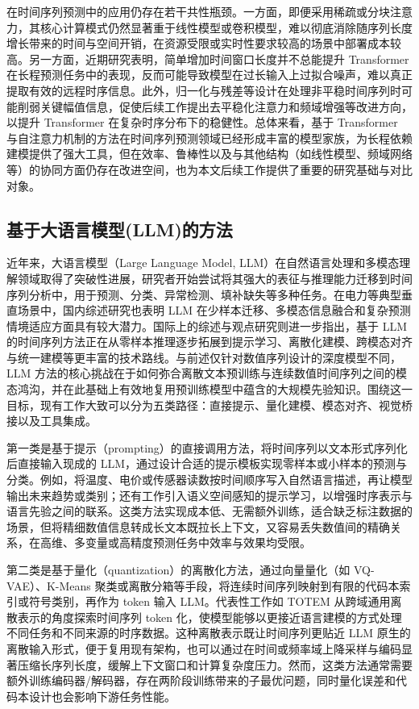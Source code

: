 在时间序列预测中的应用仍存在若干共性瓶颈。一方面，即便采用稀疏或分块注意力，其核心计算模式仍然显著重于线性模型或卷积模型，难以彻底消除随序列长度增长带来的时间与空间开销，在资源受限或实时性要求较高的场景中部署成本较高。另一方面，近期研究表明，简单增加时间窗口长度并不总能提升 Transformer 在长程预测任务中的表现，反而可能导致模型在过长输入上过拟合噪声，难以真正提取有效的远程时序信息。此外，归一化与残差等设计在处理非平稳时间序列时可能削弱关键幅值信息，促使后续工作提出去平稳化注意力\cite{liu2022nonstationary}和频域增强等改进方向，以提升 Transformer 在复杂时序分布下的稳健性。总体来看，基于 Transformer 与自注意力机制的方法在时间序列预测领域已经形成丰富的模型家族，为长程依赖建模提供了强大工具，但在效率、鲁棒性以及与其他结构（如线性模型、频域网络等）的协同方面仍存在改进空间，也为本文后续工作提供了重要的研究基础与对比对象。

\subsection{基于大语言模型(LLM)的方法} 近年来，大语言模型（Large Language Model, LLM）在自然语言处理和多模态理解领域取得了突破性进展，研究者开始尝试将其强大的表征与推理能力迁移到时间序列分析中，用于预测、分类、异常检测、填补缺失等多种任务。在电力等典型垂直场景中，国内综述研究也表明 LLM 在少样本迁移、多模态信息融合和复杂预测情境适应方面具有较大潜力\cite{zhang2025llmpowercn}。国际上的综述与观点研究则进一步指出，基于 LLM 的时间序列方法正在从零样本推理逐步拓展到提示学习、离散化建模、跨模态对齐与统一建模等更丰富的技术路线\cite{zhang2024llmtsurvey,jin2024position}。与前述仅针对数值序列设计的深度模型不同，LLM 方法的核心挑战在于如何弥合离散文本预训练与连续数值时间序列之间的模态鸿沟，并在此基础上有效地复用预训练模型中蕴含的大规模先验知识。围绕这一目标，现有工作大致可以分为五类路径：直接提示、量化建模、模态对齐、视觉桥接以及工具集成。

第一类是基于提示（prompting）的直接调用方法，将时间序列以文本形式序列化后直接输入现成的 LLM，通过设计合适的提示模板实现零样本或小样本的预测与分类。例如，将温度、电价或传感器读数按时间顺序写入自然语言描述，再让模型输出未来趋势或类别；还有工作引入语义空间感知的提示学习，以增强时序表示与语言先验之间的联系\cite{gruver2024zeroshot,pan2024s2ipllm}。这类方法实现成本低、无需额外训练，适合缺乏标注数据的场景，但将精细数值信息转成长文本既拉长上下文，又容易丢失数值间的精确关系，在高维、多变量或高精度预测任务中效率与效果均受限。

第二类是基于量化（quantization）的离散化方法，通过向量量化（如 VQ-VAE）、K-Means 聚类或离散分箱等手段，将连续时间序列映射到有限的代码本索引或符号类别，再作为 token 输入 LLM。代表性工作如 TOTEM 从跨域通用离散表示的角度探索时间序列 token 化，使模型能够以更接近语言建模的方式处理不同任务和不同来源的时序数据\cite{talukder2024totem}。这种离散表示既让时间序列更贴近 LLM 原生的离散输入形式，便于复用现有架构，也可以通过在时间或频率域上降采样与编码显著压缩长序列长度，缓解上下文窗口和计算复杂度压力。然而，这类方法通常需要额外训练编码器/解码器，存在两阶段训练带来的子最优问题，同时量化误差和代码本设计也会影响下游任务性能。

